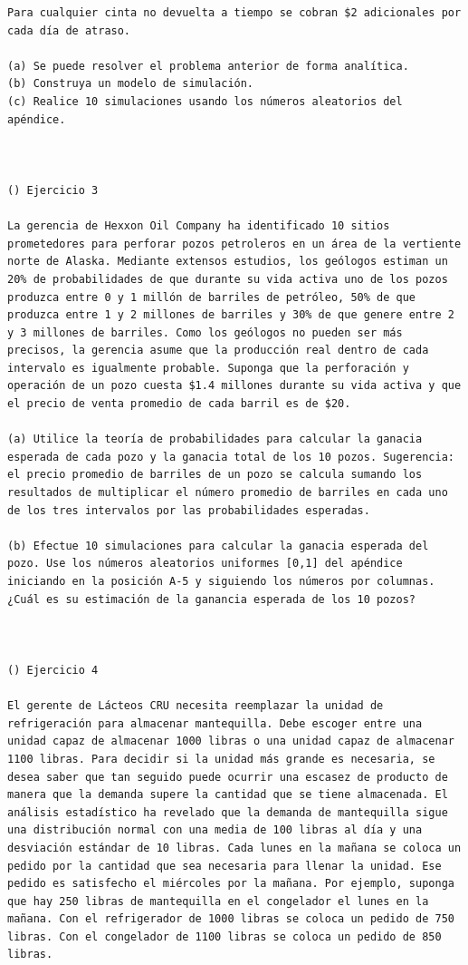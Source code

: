 \begin{verbatim}
Para cualquier cinta no devuelta a tiempo se cobran $2 adicionales por cada día de atraso. 

(a) Se puede resolver el problema anterior de forma analítica.
(b) Construya un modelo de simulación.
(c) Realice 10 simulaciones usando los números aleatorios del apéndice.



() Ejercicio 3

La gerencia de Hexxon Oil Company ha identificado 10 sitios prometedores para perforar pozos petroleros en un área de la vertiente norte de Alaska. Mediante extensos estudios, los geólogos estiman un 20% de probabilidades de que durante su vida activa uno de los pozos produzca entre 0 y 1 millón de barriles de petróleo, 50% de que produzca entre 1 y 2 millones de barriles y 30% de que genere entre 2 y 3 millones de barriles. Como los geólogos no pueden ser más precisos, la gerencia asume que la producción real dentro de cada intervalo es igualmente probable. Suponga que la perforación y operación de un pozo cuesta $1.4 millones durante su vida activa y que el precio de venta promedio de cada barril es de $20. 

(a) Utilice la teoría de probabilidades para calcular la ganacia esperada de cada pozo y la ganacia total de los 10 pozos. Sugerencia: el precio promedio de barriles de un pozo se calcula sumando los resultados de multiplicar el número promedio de barriles en cada uno de los tres intervalos por las probabilidades esperadas.

(b) Efectue 10 simulaciones para calcular la ganacia esperada del pozo. Use los números aleatorios uniformes [0,1] del apéndice iniciando en la posición A-5 y siguiendo los números por columnas. ¿Cuál es su estimación de la ganancia esperada de los 10 pozos?



() Ejercicio 4

El gerente de Lácteos CRU necesita reemplazar la unidad de refrigeración para almacenar mantequilla. Debe escoger entre una unidad capaz de almacenar 1000 libras o una unidad capaz de almacenar 1100 libras. Para decidir si la unidad más grande es necesaria, se desea saber que tan seguido puede ocurrir una escasez de producto de manera que la demanda supere la cantidad que se tiene almacenada. El análisis estadístico ha revelado que la demanda de mantequilla sigue una distribución normal con una media de 100 libras al día y una desviación estándar de 10 libras. Cada lunes en la mañana se coloca un pedido por la cantidad que sea necesaria para llenar la unidad. Ese pedido es satisfecho el miércoles por la mañana. Por ejemplo, suponga que hay 250 libras de mantequilla en el congelador el lunes en la mañana. Con el refrigerador de 1000 libras se coloca un pedido de 750 libras. Con el congelador de 1100 libras se coloca un pedido de 850 libras.


\end{verbatim}
